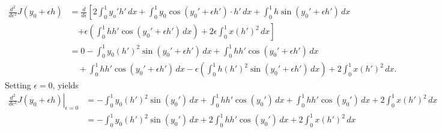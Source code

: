 \documentclass{article}
\begin{document}
\begin{equation*}
  \begin{split}
     \frac{d^2}{d\epsilon^2}J(y_0 + \epsilon h) 
     & = \frac{d}{d\epsilon}\left[2\int_0^1 y_o' h'\, dx +
  \int_0^1 y_0\cos(y_0' + \epsilon h')\cdot h'\, dx
   +  \int_0 ^1 h\sin(y_0'
      + \epsilon h')\, dx \right.\\
  &\quad\left.  + \epsilon\left(\int_0^1 hh'\cos(y_0' +
      \epsilon h')\, dx\right) +2\epsilon \int_0^1x (h')^2\, dx\right] \\
  &= 0 - \int_0^1 y_0 (h')^2\sin(y_0' + \epsilon h') \,dx + \int_0^1
  hh'\cos(y_0' + \epsilon h')\,dx\\
  &\quad +\int_0^1 hh'\cos(y_0' +
      \epsilon h')\, dx - \epsilon \left(\int_0^1 h(h')^2\sin(y_0' +
      \epsilon h')\, dx\right) + 2\int_0^1x(h')^2\, dx.
  \end{split}
\end{equation*}
Setting $\epsilon = 0$, yields
\begin{equation*}
  \begin{split}
     \left. \frac{d^2}{d\epsilon^2}J(y_0 + \epsilon h)\right|_{\epsilon = 0} &=
 - \int_0^1 y_0 (h')^2\sin(y_0') \,dx + \int_0^1 hh'\cos(y_0')\,dx
 +\int_0^1 hh'\cos(y_0')\, dx + 2\int_0^1x(h')^2\, dx\\
 &= - \int_0^1 y_0 (h')^2\sin(y_0') \,dx + 2\int_0^1 hh'\cos(y_0')\,dx
+ 2\int_0^1x(h')^2\, dx\\
  \end{split}
\end{equation*}
\end{document}
